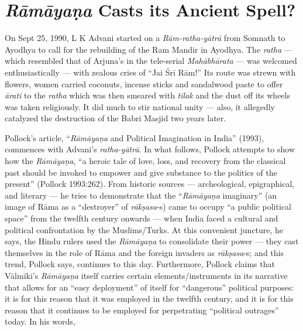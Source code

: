 \chapter{{\sl\bfseries Rāmāyaṇa} Casts its Ancient Spell?}\label{chapter3} 


On Sept 25, 1990, L K Advani started on a {\sl Rām-ratha-yātrā} from Somnath to Ayodhya to call for the rebuilding of the Ram Mandir in Ayodhya. The {\sl ratha} — which resembled that of Arjuna’s in the tele-serial {\sl Mahābhārata} — was welcomed enthusiastically — with zealous cries of “Jai Śrī Rām!” Its route was strewn with flowers, women carried coconuts, incense sticks and sandalwood paste to offer {\sl ārati} to the {\sl ratha} which was then smeared with {\sl tilak} and the dust off its wheels was taken religiously. It did much to stir national unity — also, it allegedly catalyzed the destruction of the Babri Masjid two years later.   

Pollock’s article, “{\sl Rāmāyaṇa} and Political Imagination in India” (1993), commences with Advani’s {\sl ratha-yātrā}. In what follows, Pollock attempts to show how the {\sl Rāmāyaṇa}, “a heroic tale of love, loss, and recovery from the classical past should be invoked to empower and give substance to the politics of the present” (Pollock 1993:262). From historic sources — archeological, epigraphical, and literary — he tries to demonstrate that the “{\sl Rāmāyaṇa} imaginary” (an image of Rāma as a “destroyer” of {\sl rākṣasa}-s) came to occupy “a public political space” from the twelfth century onwards — when India faced a cultural and political confrontation by the Muslims/Turks. At this convenient juncture, he says, the Hindu rulers used the {\sl Rāmāyaṇa} to consolidate their power — they cast themselves in the role of Rāma and the foreign invaders as {\sl rākṣasa}-s; and this trend, Pollock says, continues to this day. Furthermore, Pollock claims that Vālmīki’s {\sl Rāmāyaṇa} itself carries certain elements/instruments in its narrative that allows for an “easy deployment” of itself for “dangerous” political purposes: it is for this reason that it was employed in the twelfth century, and it is for this reason that it continues to be employed for perpetrating “political outrages” today. In his words,   

